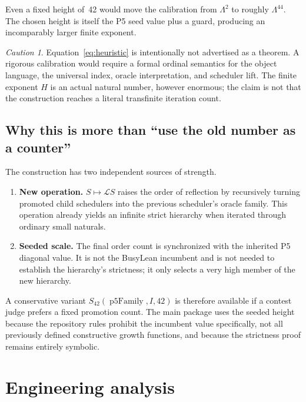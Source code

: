 \documentclass[11pt]{article}
\theoremstyle{definition}
\theoremstyle{remark}
\newtheorem{caution}[theorem]{Caution}
\newcommand{\Lift}{\mathcal L}
\newcommand{\Idx}{I}
\newcommand{\Height}{H}
\begin{document}
Even a fixed height of~42 would move the calibration from \(\Lambda^2\) to
roughly \(\Lambda^{44}\).  The chosen height is itself the P5 seed value plus a
guard, producing an incomparably larger finite exponent.

\begin{caution}
Equation~\eqref{eq:heuristic} is intentionally not advertised as a theorem.  A
rigorous calibration would require a formal ordinal semantics for the object
language, the universal index, oracle interpretation, and scheduler lift.  The
finite exponent \(\Height\) is an actual natural number, however enormous; the
claim is not that the construction reaches a literal transfinite iteration
count.
\end{caution}

\subsection{Why this is more than ``use the old number as a counter''}

The construction has two independent sources of strength.
\begin{enumerate}[leftmargin=*]
\item \textbf{New operation.} \(S\mapsto\Lift S\) raises the order of reflection
      by recursively turning promoted child schedulers into the previous
      scheduler's oracle family.  This operation already yields an infinite
      strict hierarchy when iterated through ordinary small naturals.
\item \textbf{Seeded scale.} The final order count is synchronized with the
      inherited P5 diagonal value.  It is not the BusyLean incumbent and is not
      needed to establish the hierarchy's strictness; it only selects a very
      high member of the new hierarchy.
\end{enumerate}
A conservative variant \(S_{42}(\operatorname{p5Family},\Idx,42)\) is therefore
available if a contest judge prefers a fixed promotion count.  The main package
uses the seeded height because the repository rules prohibit the incumbent
value specifically, not all previously defined constructive growth functions,
and because the strictness proof remains entirely symbolic.

\section{Engineering analysis}
\end{document}

